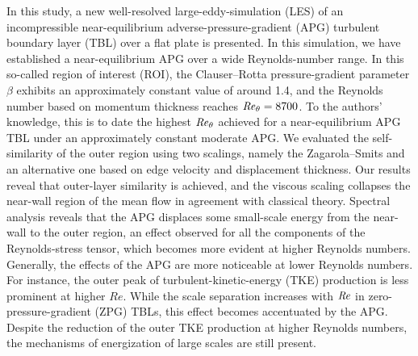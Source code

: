 \begin{paper}

\makepapertitle

%
\begin{paperabstract}
In this study, a new well-resolved large-eddy-simulation (LES) of an incompressible near-equilibrium adverse-pressure-gradient (APG) turbulent boundary layer (TBL) over a flat plate is presented. In this simulation, we have established a near-equilibrium APG over a wide Reynolds-number range. In this so-called region of interest (ROI), the Clauser--Rotta pressure-gradient parameter $\beta$ exhibits an approximately constant value of around 1.4, and the Reynolds number based on momentum thickness reaches $\mbox{\textit{Re}}_{\theta}=8700$. To the authors’ knowledge, this is to date the highest $\mbox{\textit{Re}}_{\theta}$ achieved for a near-equilibrium APG TBL under an approximately constant moderate APG.  
We evaluated the self-similarity of the outer region using two scalings, namely the Zagarola--Smits and an alternative one based on edge velocity and displacement thickness. 
Our results reveal that outer-layer similarity is achieved, and the viscous scaling collapses the near-wall region of the mean flow in agreement with classical theory.
Spectral analysis reveals that the APG displaces some small-scale energy from the near-wall to the outer region, an effect observed for all the components of the Reynolds-stress tensor, which becomes more evident at higher Reynolds numbers.
Generally, the effects of the APG are more noticeable at lower Reynolds numbers. For instance, the outer peak of turbulent-kinetic-energy (TKE) production is less prominent at higher $Re$. 
While the scale separation increases with $\mbox{\textit{Re}}$ in zero-pressure-gradient (ZPG) TBLs, this effect becomes accentuated by the APG. Despite the reduction of the outer TKE production at higher Reynolds numbers, the mechanisms of energization of large scales are still present. 
\end{paperabstract}


%



%



\end{paper}

